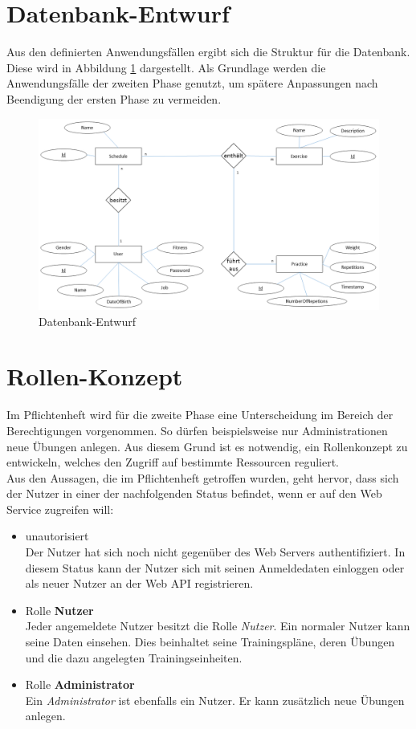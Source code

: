 \section{Datenbank-Entwurf}
\label{sec:Datenbank-Entwurf}
Aus den definierten Anwendungsfällen ergibt sich die Struktur für die Datenbank. Diese wird in Abbildung \ref{pic:db-entwurf} dargestellt. Als Grundlage werden die Anwendungsfälle der zweiten Phase genutzt, um spätere Anpassungen nach Beendigung der ersten Phase zu vermeiden.

\begin{figure}[h]
\centering
\includegraphics[width=0.8\linewidth]{content/images/DB-Entwurf.png}
\caption{Datenbank-Entwurf}
\label{pic:db-entwurf}
\end{figure}

\newpage
\section{Rollen-Konzept}
\label{sec:rollen-konzept}
Im Pflichtenheft wird für die zweite Phase eine Unterscheidung im Bereich der Berechtigungen vorgenommen. So dürfen beispielsweise nur Administrationen neue Übungen anlegen. Aus diesem Grund ist es notwendig, ein Rollenkonzept zu entwickeln, welches den Zugriff auf bestimmte Ressourcen reguliert. \\
Aus den Aussagen, die im Pflichtenheft getroffen wurden, geht hervor, dass sich der Nutzer in einer der nachfolgenden Status befindet, wenn er auf den Web Service zugreifen will: 
\begin{itemize}
\item unautorisiert \\
Der Nutzer hat sich noch nicht gegenüber des Web Servers authentifiziert. In diesem Status kann der Nutzer sich mit seinen Anmeldedaten einloggen oder als neuer Nutzer an der Web \ac{API} registrieren.
\item Rolle \textbf{Nutzer}\\
Jeder angemeldete Nutzer besitzt die Rolle \textit{Nutzer}. Ein normaler Nutzer kann seine Daten einsehen. Dies beinhaltet seine Trainingspläne, deren Übungen und die dazu angelegten Trainingseinheiten.
\item Rolle \textbf{Administrator}\\
Ein \textit{Administrator} ist ebenfalls ein Nutzer. Er kann zusätzlich neue Übungen anlegen. 
\end{itemize}